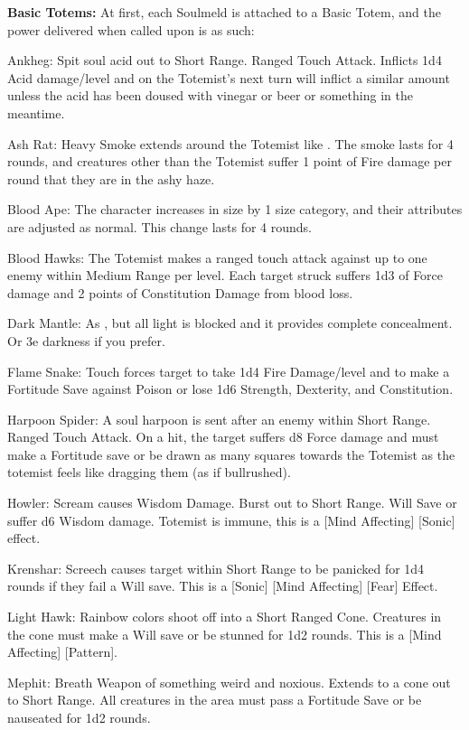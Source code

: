 \textbf{Basic Totems:} At first, each Soulmeld is attached to a Basic Totem, and the power delivered when called upon is as such:
\begin{description*}
\item[Ankheg:] Spit soul acid out to Short Range. Ranged Touch Attack. Inflicts 1d4 Acid damage/level and on the Totemist's next turn will inflict a similar amount unless the acid has been doused with vinegar or beer or something in the meantime.
\item[Ash Rat:] Heavy Smoke extends around the Totemist like . The smoke lasts for 4 rounds, and creatures other than the Totemist suffer 1 point of Fire damage per round that they are in the ashy haze.
\item[Blood Ape:] The character increases in size by 1 size category, and their attributes are adjusted as normal. This change lasts for 4 rounds.
\item[Blood Hawks:] The Totemist makes a ranged touch attack against up to one enemy within Medium Range per level. Each target struck suffers 1d3 of Force damage and 2 points of Constitution Damage from blood loss.
\item[Dark Mantle:] As , but all light is blocked and it provides complete concealment. Or 3e darkness if you prefer.
\item[Flame Snake:] Touch forces target to take 1d4 Fire Damage/level and to make a Fortitude Save against Poison or lose 1d6 Strength, Dexterity, and Constitution.
\item[Harpoon Spider:] A soul harpoon is sent after an enemy within Short Range. Ranged Touch Attack. On a hit, the target suffers d8 Force damage and must make a Fortitude save or be drawn as many squares towards the Totemist as the totemist feels like dragging them (as if bullrushed).
\item[Howler:] Scream causes Wisdom Damage. Burst out to Short Range. Will Save or suffer d6 Wisdom damage. Totemist is immune, this is a [Mind Affecting] [Sonic] effect.
\item[Krenshar:] Screech causes target within Short Range to be panicked for 1d4 rounds if they fail a Will save. This is a [Sonic] [Mind Affecting] [Fear] Effect.
\item[Light Hawk:] Rainbow colors shoot off into a Short Ranged Cone. Creatures in the cone must make a Will save or be stunned for 1d2 rounds. This is a [Mind Affecting] [Pattern].
\item[Mephit:] Breath Weapon of something weird and noxious. Extends to a cone out to Short Range. All creatures in the area must pass a Fortitude Save or be nauseated for 1d2 rounds.

\end{description*}
